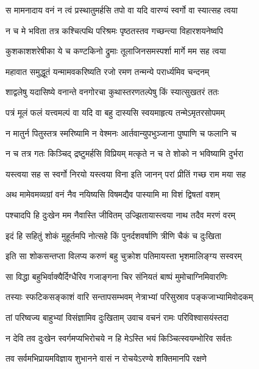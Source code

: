 \twolineshloka
{स मामनादाय वनं न त्वं प्रस्थातुमर्हसि}
{तपो वा यदि वारण्यं स्वर्गो वा स्यात्सह त्वया} %

\twolineshloka
{न च मे भविता तत्र कश्चित्पथि परिश्रमः}
{पृष्ठतस्तव गच्छन्त्या विहारशयनेष्वपि} %

\twolineshloka
{कुशकाशशरेषीका ये च कण्टकिनो द्रुमाः}
{तूलाजिनसमस्पर्शा मार्गे मम सह त्वया} %

\twolineshloka
{महावात समुद्धूतं यन्मामवकरिष्यति}
{रजो रमण तन्मन्ये परार्ध्यमिव चन्दनम्} %

\twolineshloka
{शाद्वलेषु यदासिष्ये वनान्ते वनगोरचा}
{कुथास्तरणतल्पेषु किं स्यात्सुखतरं ततः} %

\twolineshloka
{पत्रं मूलं फलं यत्त्वमल्पं वा यदि वा बहु}
{दास्यसि स्वयमाहृत्य तन्मेऽमृतरसोपमम्} %

\twolineshloka
{न मातुर्न पितुस्तत्र स्मरिष्यामि न वेश्मनः}
{आर्तवान्युपभुञ्जाना पुष्पाणि च फलानि च} %

\twolineshloka
{न च तत्र गतः किञ्चिद् द्रष्टुमर्हसि विप्रियम्}
{मत्कृते न च ते शोको न भविष्यामि दुर्भरा} %

\twolineshloka
{यस्त्वया सह स स्वर्गो निरयो यस्त्वया विना}
{इति जानन् परां प्रीतिं गच्छ राम मया सह} %

\twolineshloka
{अथ मामेवमव्यग्रां वनं नैव नयिष्यसि}
{विषमद्यैव पास्यामि मा विशं द्विषतां वशम्} %

\twolineshloka
{पश्चादपि हि दुःखेन मम नैवास्ति जीवितम्}
{उज्झितायास्त्वया नाथ तदैव मरणं वरम्} %

\twolineshloka
{इदं हि सहितुं शोकं मुहूर्तमपि नोत्सहे}
{किं पुनर्दशवर्षाणि त्रीणि चैकं च दुःखिता} %

\twolineshloka
{इति सा शोकसन्तप्ता विलप्य करुणं बहु}
{चुक्रोश पतिमायस्ता भृशमालिङ्ग्य सस्वरम्} %

\twolineshloka
{सा विद्धा बहुभिर्वाक्यैर्दिग्धैरिव गजाङ्गना}
{चिर संनियतं बाष्पं मुमोचाग्निमिवारणिः} %

\twolineshloka
{तस्याः स्फटिकसङ्काशं वारि सन्तापसम्भवम्}
{नेत्राभ्यां परिसुस्राव पङ्कजाभ्यामिवोदकम्} %

\twolineshloka
{तां परिष्वज्य बाहुभ्यां विसंज्ञामिव दुःखिताम्}
{उवाच वचनं रामः परिविश्वासयंस्तदा} %

\twolineshloka
{न देवि तव दुःखेन स्वर्गमप्यभिरोचये}
{न हि मेऽस्ति भयं किञ्चित्स्वयम्भोरिव सर्वतः} %

\twolineshloka
{तव सर्वमभिप्रायमविज्ञाय शुभानने}
{वासं न रोचयेऽरण्ये शक्तिमानपि रक्षणे} %

